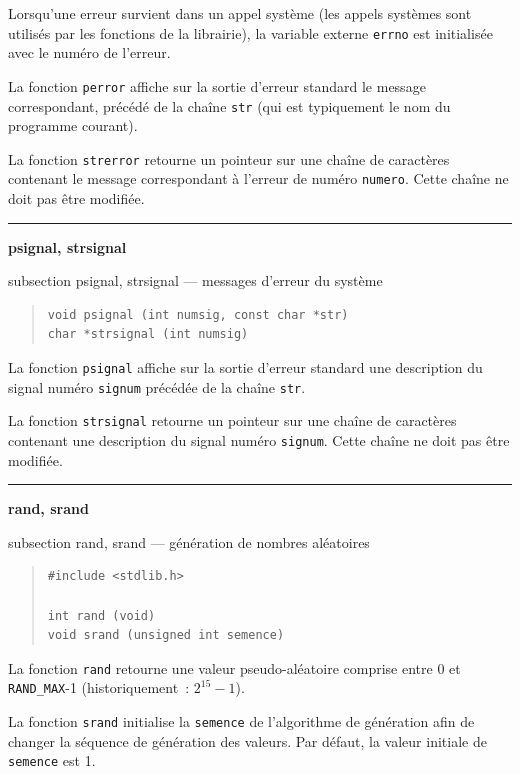 \documentclass [twoside] {report}
\newcommand {\primitive} [1]
    {
	\phantomsection
	{\large \textbf {#1}}
	\addcontentsline {toc} {subsection} {#1}
    }
\newcommand {\separation}
    {
	\vspace {5mm}
	\nopagebreak
	\hrule
    }
\begin{document}
Lorsqu'une erreur survient dans un appel système (les
appels systèmes sont utilisés par les fonctions de la
librairie), la variable externe \texttt {errno} est initialisée avec
le numéro de l'erreur.

La fonction \texttt {perror} affiche sur la sortie d'erreur standard le
message correspondant, précédé de la chaîne \texttt {str} (qui est
typiquement le nom du programme courant).

La fonction \texttt {strerror} retourne un pointeur sur une chaîne de
caractères contenant le message correspondant à l'erreur de numéro
\texttt {numero}. Cette chaîne ne doit pas être modifiée.



\separation 
\primitive {psignal, strsignal} --- messages d'erreur du système

\begin {quote}
\begin {verbatim}
void psignal (int numsig, const char *str)
char *strsignal (int numsig)
\end{verbatim}
\end {quote}

La fonction \texttt {psignal} affiche sur la sortie d'erreur standard une
description du signal numéro \texttt {signum} précédée de la chaîne
\texttt {str}.

La fonction \texttt {strsignal} retourne un pointeur sur une chaîne de
caractères contenant une description du signal numéro \texttt {signum}.
Cette chaîne ne doit pas être modifiée.



\separation 
\primitive {rand, srand} --- génération de nombres aléatoires

\begin {quote}
\begin {verbatim}
#include <stdlib.h>

int rand (void)
void srand (unsigned int semence)
\end{verbatim}
\end {quote}

La fonction \texttt {rand} retourne une valeur pseudo-aléatoire comprise
entre 0 et \texttt {RAND\_MAX}-1 (historiquement~: $2^{15}-1$).

La fonction \texttt {srand} initialise la \texttt {semence} de l'algorithme de
génération afin de changer la séquence de génération des valeurs.
Par défaut, la valeur initiale de \texttt {semence} est 1.
\end{document}
